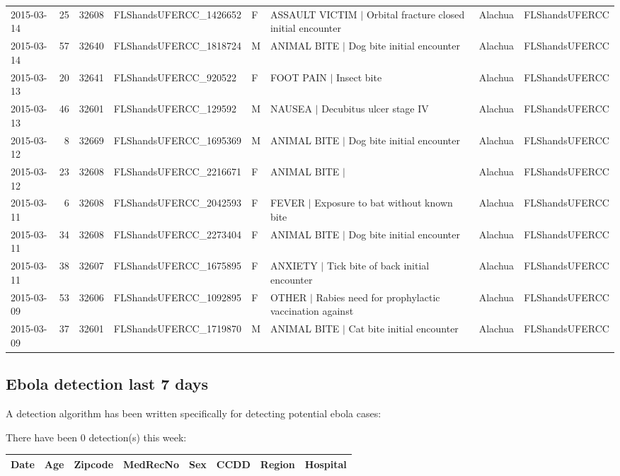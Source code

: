 \documentclass[12pt]{article}
\begin{document}
\begin{table}[H]
\begin{table}[ht]
{\begin{tabular}{lrrlllll}
  2015-03-14 &  25 & 32608 & FLShandsUFERCC\_1426652 & F & ASSAULT VICTIM $|$ Orbital fracture closed initial encounter & Alachua & FLShandsUFERCC \\ 
  2015-03-14 &  57 & 32640 & FLShandsUFERCC\_1818724 & M & ANIMAL BITE $|$ Dog bite initial encounter & Alachua & FLShandsUFERCC \\ 
  2015-03-13 &  20 & 32641 & FLShandsUFERCC\_920522 & F & FOOT PAIN $|$ Insect bite & Alachua & FLShandsUFERCC \\ 
  2015-03-13 &  46 & 32601 & FLShandsUFERCC\_129592 & M & NAUSEA $|$ Decubitus ulcer stage IV & Alachua & FLShandsUFERCC \\ 
  2015-03-12 &   8 & 32669 & FLShandsUFERCC\_1695369 & M & ANIMAL BITE $|$ Dog bite initial encounter & Alachua & FLShandsUFERCC \\ 
  2015-03-12 &  23 & 32608 & FLShandsUFERCC\_2216671 & F & ANIMAL BITE $|$ & Alachua & FLShandsUFERCC \\ 
  2015-03-11 &   6 & 32608 & FLShandsUFERCC\_2042593 & F & FEVER $|$ Exposure to bat without known bite & Alachua & FLShandsUFERCC \\ 
  2015-03-11 &  34 & 32608 & FLShandsUFERCC\_2273404 & F & ANIMAL BITE $|$ Dog bite initial encounter & Alachua & FLShandsUFERCC \\ 
  2015-03-11 &  38 & 32607 & FLShandsUFERCC\_1675895 & F & ANXIETY $|$ Tick bite of back initial encounter & Alachua & FLShandsUFERCC \\ 
  2015-03-09 &  53 & 32606 & FLShandsUFERCC\_1092895 & F & OTHER $|$ Rabies need for prophylactic vaccination against & Alachua & FLShandsUFERCC \\ 
  2015-03-09 &  37 & 32601 & FLShandsUFERCC\_1719870 & M & ANIMAL BITE $|$ Cat bite initial encounter & Alachua & FLShandsUFERCC \\ 
   \hline
\end{tabular}
}
\end{table}\end{table}

\newpage
\subsection*{Ebola detection last 7 days}

A detection algorithm has been written specifically for detecting potential ebola cases:

There have been 0 detection(s) this week:

\begin{table}[H]
\begin{table}[ht]
\centering
{\tiny
\begin{tabular}{rrrlllll}
  \hline
Date & Age & Zipcode & MedRecNo & Sex & CCDD & Region & Hospital \\ 
  \hline
\hline
\end{tabular}
}
\end{table}\end{table}
\end{document}
